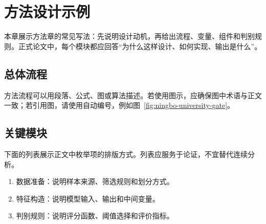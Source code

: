 \chapter{方法设计示例}
\label{chap:method-example}

本章展示方法章的常见写法：先说明设计动机，再给出流程、变量、组件和判别规则。正式论文中，每个模块都应回答“为什么这样设计、如何实现、输出是什么”。

\section{总体流程}
\label{sec:method-flow}

方法流程可以用段落、公式、图或算法描述。若使用图示，应确保图中术语与正文一致；若引用图，请使用自动编号，例如图~\ref{fig:ningbo-university-gate}。

\section{关键模块}
\label{sec:key-components}

下面的列表展示正文中枚举项的排版方式。列表应服务于论证，不宜替代连续分析。

\begin{enumerate}[label=\arabic*.]
  \item 数据准备：说明样本来源、筛选规则和划分方式。
  \item 特征构造：说明模型输入、输出和中间变量。
  \item 判别规则：说明评分函数、阈值选择和评价指标。
\end{enumerate}
